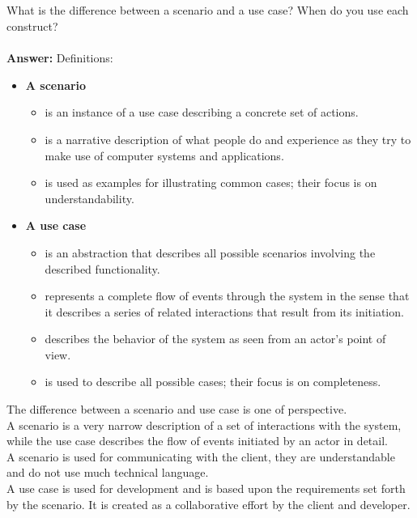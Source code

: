\documentclass[a4paper]{article}
\begin{document}
\subsection{}
What is the difference between a scenario and a use case? When do you use each construct?\\
\\
\textbf{Answer:} 
Definitions:
\begin{itemize}
\item \textbf{A scenario} 
\begin{itemize}
\item is an instance of a use case describing a concrete set of actions.
\item is a narrative description of what people do and experience as they try to make use of computer systems and applications.
\item is used as examples for illustrating common cases; their focus is on understandability.
\end{itemize}
\item \textbf{A use case} 
\begin{itemize}
\item is an abstraction that describes all possible scenarios involving the described functionality.
\item represents a complete flow of events through the system in the sense that it describes a series of related interactions that result from its initiation.
\item describes the behavior of the system as seen from an actor’s point of view.
\item is used to describe all possible cases; their focus is on completeness. 
\end{itemize}
\end{itemize}
The difference between a scenario and use case is one of perspective. \\
A scenario is a very narrow description of a set of interactions with the system, while the use case describes the flow of events initiated by an actor in detail.\\
A scenario is used for communicating with the client, they are understandable and do not use much technical language.\\
A use case is used for development and is based upon the requirements set forth by the scenario. It is created as a collaborative effort by the client and developer.
\end{document}
